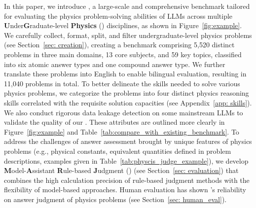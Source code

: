 


In this paper, we introduce \textbf{{\benchmark}}, a large-scale and comprehensive benchmark tailored for evaluating the physics problem-solving abilities of LLMs across multiple \textbf{U}nder\textbf{G}raduate-level \textbf{Physics} (\textbf{{\benchmark}}) disciplines, as shown in Figure~\ref{fig:example}.
We carefully collect, format, split, and filter undergraduate-level physics problems (see Section~\ref{sec: creation}), creating a benchmark comprising 5,520 distinct problems in three main domains, 13 core subjects, and 59 key topics, classified into six atomic answer types and one compound answer type.
We further translate these problems into English to enable bilingual evaluation, resulting in 11,040 problems in total.
To better delineate the skills needed to solve various physics problems, we categorize the problems into four distinct physics reasoning skills correlated with the requisite solution capacities (see Appendix~\ref{app: skills}).
We also conduct rigorous data leakage detection on some mainstream LLMs to validate the quality of our {\benchmark}.
These attributes are outlined more clearly in Figure~\ref{fig:example} and Table~\ref{tab:compare_with_existing_benchmark}.
To address the challenges of answer assessment brought by unique features of physics problems (e.g., physical constants, equivalent quantities defined in problem descriptions, examples given in Table~\ref{tab:physcis_judge_example}), we develop \textbf{M}odel-\textbf{A}ssistant \textbf{R}ule-based \textbf{J}udgment (\textbf{\judge}) (see Section~\ref{sec: evaluation}) that combines the high calculation precision of rule-based judgment methods with the flexibility of model-based approaches.
Human evaluation has shown {\judge}'s reliability on answer judgment of physics problems (see Section~\ref{sec: human_eval}).





